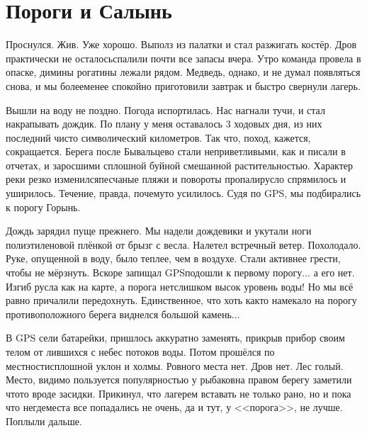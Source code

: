 \chapter{Пороги и Салынь} 

Проснулся. Жив. Уже хорошо. Выполз из палатки и стал разжигать костёр. Дров практически не осталось\mdash спалили почти все запасы вчера. Утро команда провела в опаске, димины рогатины лежали рядом. Медведь, однако, и не думал появляться снова, и мы более\sdash менее спокойно приготовили завтрак и быстро свернули лагерь. 

Вышли на воду не поздно. Погода испортилась. Нас нагнали тучи, и стал накрапывать дождик. По плану у меня оставалось 3 ходовых дня, из них последний чисто символический километров. Так что, поход, кажется, сокращается. Берега после Бывальцево стали неприветливыми, как и писали в отчетах, и заросшими сплошной буйной смешанной растительностью. Характер реки резко изменился\mdash песчаные пляжи и повороты пропали\mdash русло спрямилось и уширилось. Течение, правда, почему\sdash то усилилось. Судя по GPS, мы подбирались к порогу Горынь.

Дождь зарядил пуще прежнего. Мы надели дождевики и укутали ноги полиэтиленовой плёнкой от брызг с весла. Налетел встречный ветер. Похолодало. Руке, опущенной в воду, было теплее, чем в воздухе. Стали активнее грести, чтобы не мёрзнуть. Вскоре запищал GPS\mdash подошли к первому порогу$\ldots$ а его нет. Изгиб русла как на карте, а порога нет\mdash слишком высок уровень воды! Но мы всё равно причалили передохнуть. Единственное, что хоть как\sdash то намекало на порог\mdash у противоположного берега виднелся большой камень$\ldots$ 

В GPS сели батарейки, пришлось аккуратно заменять, прикрыв прибор своим телом от лившихся с небес потоков воды. Потом прошёлся по местности\mdash сплошной уклон и холмы. Ровного места нет. Дров нет. Лес голый. Место, видимо пользуется популярностью у рыбаков\mdash на правом берегу заметили что\sdash то вроде засидки. Прикинул, что лагерем вставать не только рано, но и пока что негде\mdash места все попадались не очень, да и тут, у <<порога>>, не лучше. Поплыли дальше. 

